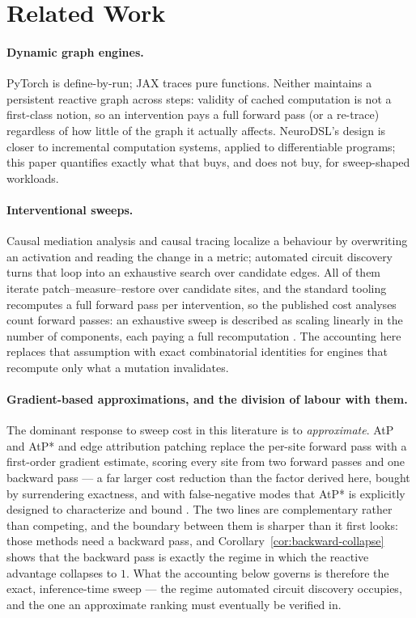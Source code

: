 \documentclass[11pt,a4paper]{article}
\begin{document}
\section{Related Work}
\label{sec:related}

\paragraph{Dynamic graph engines.} PyTorch \cite{pytorch} is define-by-run; JAX \cite{jax} traces pure functions. Neither maintains a persistent reactive graph across steps: validity of cached computation is not a first-class notion, so an intervention pays a full forward pass (or a re-trace) regardless of how little of the graph it actually affects. NeuroDSL's design \cite{neurodsl} is closer to incremental computation systems, applied to differentiable programs; this paper quantifies exactly what that buys, and does not buy, for sweep-shaped workloads.

\paragraph{Interventional sweeps.} Causal mediation analysis \cite{vig2020} and causal tracing \cite{meng2022} localize a behaviour by overwriting an activation and reading the change in a metric; automated circuit discovery \cite{conmy2023} turns that loop into an exhaustive search over candidate edges. All of them iterate patch--measure--restore over candidate sites, and the standard tooling \cite{transformerlens} recomputes a full forward pass per intervention, so the published cost analyses count forward passes: an exhaustive sweep is described as scaling linearly in the number of components, each paying a full recomputation \cite{atpstar}. The accounting here replaces that assumption with exact combinatorial identities for engines that recompute only what a mutation invalidates.

\paragraph{Gradient-based approximations, and the division of labour with them.} The dominant response to sweep cost in this literature is to \emph{approximate}. AtP and AtP* \cite{atpstar} and edge attribution patching \cite{eap} replace the per-site forward pass with a first-order gradient estimate, scoring every site from two forward passes and one backward pass --- a far larger cost reduction than the factor derived here, bought by surrendering exactness, and with false-negative modes that AtP* is explicitly designed to characterize and bound \cite{atpstar}. The two lines are complementary rather than competing, and the boundary between them is sharper than it first looks: those methods need a backward pass, and Corollary~\ref{cor:backward-collapse} shows that the backward pass is exactly the regime in which the reactive advantage collapses to $1$. What the accounting below governs is therefore the exact, inference-time sweep --- the regime automated circuit discovery \cite{conmy2023} occupies, and the one an approximate ranking must eventually be verified in.
\end{document}
